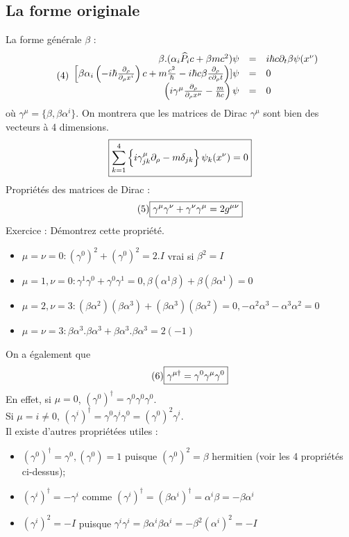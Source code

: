 \subsection{La forme originale}
La forme générale $\beta$ :
\[\tag{4}\begin{array}{ r c l }
\beta.(\alpha_i\widehat{P}_ic+\beta mc^2)\psi & = & i\hbar c\partial_t\beta\psi(x^\nu) \\
\left[\beta\alpha_i\left(-i\hbar\frac{\partial_\rho}{\partial_\rho x^i}\right)c+m\frac{c^2}{\hbar}
-i\hbar c\beta\frac{\partial_\rho}{c\partial_\rho t}\right)]\psi & = & 0 \\
 \left(i\gamma^\mu\frac{\partial_\rho}{\partial_\rho x^\mu}-\frac{m}{\hbar c}\right)\psi & = & 0 \\
\end{array}\]
où $\gamma^{\mu} = \{ \beta, \beta \alpha^i \}$. On montrera que les matrices
de Dirac $\gamma^{\mu}$ sont bien des vecteurs à 4 dimensions.
\[\boxed{\sum_{k=1}^4\left\{
i\gamma^\mu_{jk}\partial_\rho-m\delta_{jk}
\right\}\psi_k(x^\nu)=0}\]
Propriétés des matrices de Dirac :
\[
\tag{5} \boxed{\gamma^\mu\gamma^\nu+\gamma^\nu\gamma^\mu = 2g^{\mu\nu}}
\]
Exercice : Démontrez cette propriété.
\begin{itemize}
 \item $\mu=\nu=0:(\gamma^0)^2+(\gamma^0)^2=2.I$ vrai si $\beta^2=I$
 \item $\mu=1,\nu=0:\gamma^1\gamma^0+\gamma^0\gamma^1=0,
  \beta(\alpha^1\beta)+\beta(\beta\alpha^1)=0$
 \item $\mu=2,\nu=3:(\beta\alpha^2)(\beta\alpha^3)+(\beta\alpha^3)(\beta\alpha^2)=
  0, -\alpha^2\alpha^3-\alpha^3\alpha^2=0$
 \item $\mu=\nu=3:\beta\alpha^3.\beta\alpha^3+\beta\alpha^3.\beta\alpha^3=2(-1)$
\end{itemize}
On a également que
\[
\tag{6} \boxed{\gamma^{\mu\dagger} = \gamma^0\gamma^\mu\gamma^0}
\]
En effet, si $\mu=0$, $(\gamma^0)^\dagger=\gamma^0\gamma^0\gamma^0$.\\
Si $\mu=i\neq 0$, $(\gamma^i)^\dagger=\gamma^0\gamma^i\gamma^0=(\gamma^0)^2\gamma^i$.\\

Il existe d'autres propriétées utiles :
\begin{itemize}
 \item $(\gamma^0)^\dagger=\gamma^0,(\gamma^0)=1$ puisque $(\gamma^0)^2=\beta$
  hermitien (voir les 4 propriétés ci-dessus);
 \item $(\gamma^i)^\dagger=-\gamma^i$ comme $(\gamma^i)^\dagger=
  (\beta\alpha^i)^\dagger=\alpha^i\beta=-\beta\alpha^i$
 \item $(\gamma^i)^2=-I$ puisque $\gamma^i\gamma^i=\beta\alpha^i\beta\alpha^i=
  -\beta^2(\alpha^i)^2=-I$
\end{itemize}
